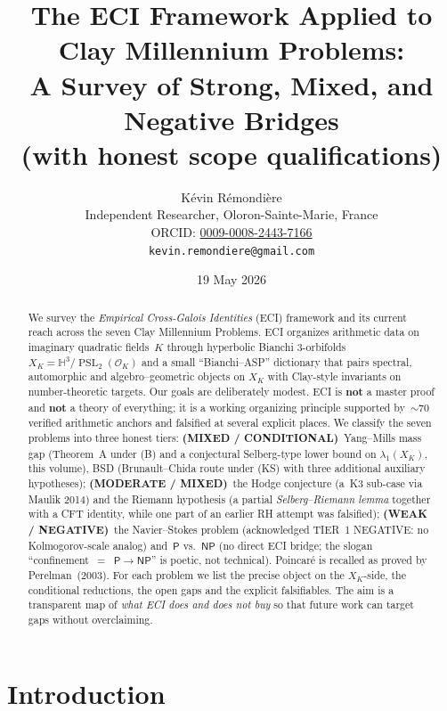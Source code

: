 \documentclass[11pt,a4paper]{article}
\title{The ECI Framework Applied to Clay Millennium Problems:\\
A Survey of Strong, Mixed, and Negative Bridges\\
(with honest scope qualifications)}
\author{K\'evin R\'emondi\`ere\\
\small Independent Researcher, Oloron-Sainte-Marie, France\\
\small ORCID: \href{https://orcid.org/0009-0008-2443-7166}{0009-0008-2443-7166}\\
\small \texttt{kevin.remondiere@gmail.com}}
\date{19 May 2026}
\theoremstyle{definition}
\DeclareMathOperator{\PSL}{PSL}
\newcommand{\OK}{\mathcal{O}_K}
\newcommand{\HH}{\mathbb{H}}
\begin{document}
\maketitle

\begin{abstract}
We survey the \emph{Empirical Cross-Galois Identities} (ECI) framework
and its current reach across the seven Clay Millennium Problems. ECI
organizes arithmetic data on imaginary quadratic fields~$K$ through
hyperbolic Bianchi 3-orbifolds $X_K = \HH^{3}/\PSL_{2}(\OK)$ and a small
``Bianchi--ASP'' dictionary that pairs spectral, automorphic and algebro--geometric
objects on $X_{K}$ with Clay-style invariants on number-theoretic targets.
Our goals are deliberately modest. ECI is \textbf{not} a master proof and
\textbf{not} a theory of everything; it is a working organizing principle
supported by~$\sim 70$ verified arithmetic anchors and falsified at
several explicit places. We classify the seven problems into three
honest tiers:
\textbf{(MIXED / CONDITIONAL)}~Yang--Mills mass gap (Theorem~A under (B) and
a conjectural Selberg-type lower bound on $\lambda_1(X_K)$, this volume),
BSD (Brunault--Chida route under (KS) with three additional auxiliary
hypotheses);
\textbf{(MODERATE / MIXED)}~the Hodge conjecture (a~K3 sub-case via Maulik 2014)
and the Riemann hypothesis (a partial \emph{Selberg--Riemann lemma}
together with a CFT identity, while one part of an earlier RH attempt
was falsified);
\textbf{(WEAK / NEGATIVE)}~the Navier--Stokes problem (acknowledged TIER~1
NEGATIVE: no Kolmogorov-scale analog) and~$\mathsf{P}$ vs.\ $\mathsf{NP}$
(no direct ECI bridge; the slogan ``confinement~$=$~$\mathsf{P}\to\mathsf{NP}$''
is poetic, not technical). Poincar\'e is recalled as proved by
Perelman~(2003). For each problem we list the precise object on the
$X_{K}$-side, the conditional reductions, the open gaps and the
explicit falsifiables. The aim is a transparent map of \emph{what
ECI does and does not buy} so that future work can target gaps without
overclaiming.
\end{abstract}

\tableofcontents
\vspace{1em}

\section{Introduction}
\label{sec:intro}
\end{document}
